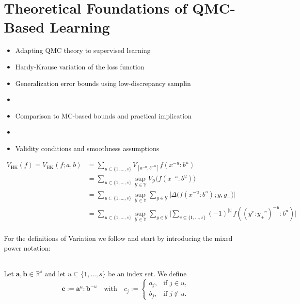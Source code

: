 \chapter{Theoretical Foundations of QMC-Based Learning}
\label{chapter5}

\begin{itemize}
    \item Adapting QMC theory to supervised learning
    \item Hardy-Krause variation of the loss function
    \item Generalization error bounds using low-discrepancy samplin\item 
    \item Comparison to MC-based bounds and practical implication\item 
    \item Validity conditions and smoothness assumptions
\end{itemize}

\begin{align*}
    V_{\mathrm{HK}}(f) = V_{\mathrm{HK}}(f; a, b) &= \sum_{u\subset \{1,\dots,s\}} V_{[a^{-u}, b^{-u}]} f(x^{-u}:b^u) \\
    &= \sum_{u\subset \{1,\dots,s\}} \sup_{\mathcal{Y} \in \mathbb{Y}} V_\mathcal{Y} \big( f(x^{-u} : b^u) \big) \\
    &= \sum_{u\subset \{1,\dots,s\}} \sup_{\mathcal{Y} \in \mathbb{Y}} \sum_{y\in\mathcal{Y}} \big| \Delta\big( f(x^{-u} : b^u); y, y_+ \big) \big| \\
    &= \sum_{u\subset \{1,\dots,s\}} \sup_{\mathcal{Y} \in \mathbb{Y}} \sum_{y\in\mathcal{Y}} \big| \sum_{v\subseteq \{1,\dots,s\}} (-1)^{|v|} f((y^v:y_+^{-v})^{-u}:b^{u}) \big| \\
\end{align*}

For the definitions of Variation we follow \cite{owen2005multidimensional} and
start by introducing the mixed power notation:

\begin{definition} \ \\
    \label{def:component_merge}
    Let $\boldsymbol{a}, \boldsymbol{b} \in \mathbb{R}^s$ and let $u \subseteq
    \{1, \dots, s\}$ be an index set. We define
    \begin{equation*}
        \boldsymbol{c} := \boldsymbol{a}^u : \boldsymbol{b}^{-u}
        \quad \text{with} \quad
        c_j := 
        \begin{cases}
            a_j, & \text{if } j \in u, \\
            b_j, & \text{if } j \notin u.
        \end{cases}
    \end{equation*}
\end{definition}


